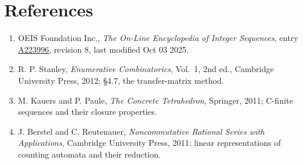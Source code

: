 \documentclass[11pt]{article}
\theoremstyle{definition}
\begin{document}
\section{References}

\begin{enumerate}

\item OEIS Foundation Inc., \emph{The On-Line Encyclopedia of Integer Sequences}, entry \href{https://oeis.org/A223996}{A223996}, revision 8, last modified Oct 03 2025.

\item R. P. Stanley, \emph{Enumerative Combinatorics}, Vol.~1, 2nd ed., Cambridge University Press, 2012; \S4.7, the transfer-matrix method.

\item M. Kauers and P. Paule, \emph{The Concrete Tetrahedron}, Springer, 2011; C-finite sequences and their closure properties.

\item J. Berstel and C. Reutenauer, \emph{Noncommutative Rational Series with Applications}, Cambridge University Press, 2011; linear representations of counting automata and their reduction.

\end{enumerate}
\end{document}
